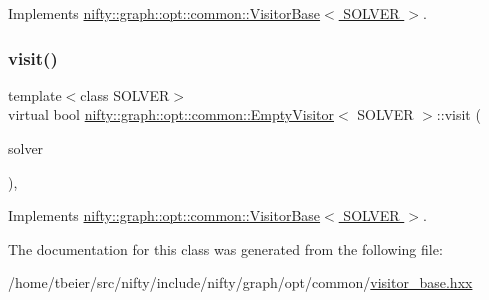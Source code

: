 Implements \hyperlink{classnifty_1_1graph_1_1opt_1_1common_1_1VisitorBase_aab59ead6ecef2fcaf3da5a96d0ec4c51}{nifty\+::graph\+::opt\+::common\+::\+Visitor\+Base$<$ S\+O\+L\+V\+E\+R $>$}.

\mbox{\label{classnifty_1_1graph_1_1opt_1_1common_1_1EmptyVisitor_a709039dcb9c0d178ba45a7182c58388d}} 
\subsubsection{\texorpdfstring{visit()}{visit()}}
{\footnotesize\ttfamily template$<$class S\+O\+L\+V\+ER$>$ \\
virtual bool \hyperlink{classnifty_1_1graph_1_1opt_1_1common_1_1EmptyVisitor}{nifty\+::graph\+::opt\+::common\+::\+Empty\+Visitor}$<$ S\+O\+L\+V\+ER $>$\+::visit (\begin{DoxyParamCaption}\item[{\hyperlink{classnifty_1_1graph_1_1opt_1_1common_1_1VisitorBase_a433d03139897d4aefe27315b2bbb3adc}{Solver\+Type} $\ast$}]{solver }\end{DoxyParamCaption})\hspace{0.3cm}{\ttfamily [inline]}, {\ttfamily [virtual]}}



Implements \hyperlink{classnifty_1_1graph_1_1opt_1_1common_1_1VisitorBase_aaeef625f11705918d3fdd05f2550a879}{nifty\+::graph\+::opt\+::common\+::\+Visitor\+Base$<$ S\+O\+L\+V\+E\+R $>$}.



The documentation for this class was generated from the following file\+:\begin{DoxyCompactItemize}
\item 
/home/tbeier/src/nifty/include/nifty/graph/opt/common/\hyperlink{visitor__base_8hxx}{visitor\+\_\+base.\+hxx}\end{DoxyCompactItemize}
